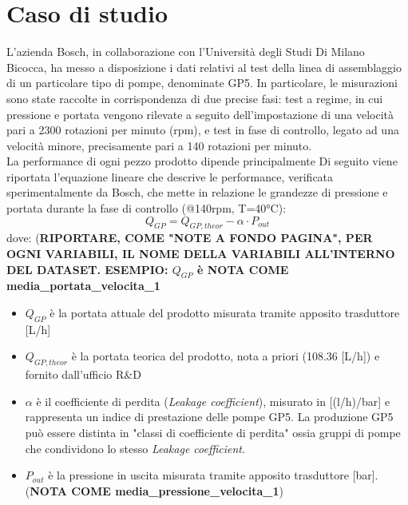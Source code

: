 \documentclass[fleqn,10pt]{SelfArx} %
\affiliation{\textsuperscript{1}\textit{794126, Dipartimento di Informatica, Sistemistica e Comunicazione}} %
\affiliation{\textsuperscript{2}\textit{793516, Dipartimento di Informatica, Sistemistica e Comunicazione}} %
\affiliation{\textsuperscript{3}\textit{?, Dipartimento di Informatica, Sistemistica e Comunicazione}}
\begin{document}
\flushbottom %

\maketitle %

\tableofcontents %

\thispagestyle{empty} %


\section{Caso di studio} %
L'azienda Bosch, in collaborazione con l'Università degli Studi Di Milano Bicocca, ha messo a disposizione i dati relativi al test della linea di assemblaggio di un particolare tipo di pompe, denominate GP5. In particolare, le misurazioni sono state raccolte in corrispondenza di due precise fasi: test a regime, in cui pressione e portata vengono rilevate a seguito dell'impostazione di una velocità pari a 2300 rotazioni per minuto (rpm), e test in fase di controllo, legato ad una velocità minore, precisamente pari a 140 rotazioni per minuto.\\
La performance di ogni pezzo prodotto dipende principalmente Di seguito viene riportata l’equazione lineare che descrive le performance, verificata sperimentalmente da
Bosch, che mette in relazione le grandezze di pressione e portata durante la fase di controllo (@140rpm, T=40°C):
\begin{equation}
    Q_{GP} = Q_{GP,theor} − \alpha \cdot P_{out}
\end{equation}
dove: (\textbf{RIPORTARE, COME "NOTE A FONDO PAGINA", PER OGNI VARIABILI, IL NOME DELLA VARIABILI ALL'INTERNO DEL DATASET. ESEMPIO: $Q_{GP}$ è NOTA COME media\_portata\_velocita\_1}
\begin{itemize}
    \item $Q_{GP}$ è la portata attuale del prodotto misurata tramite apposito trasduttore [L/h]
    \item $Q_{GP,theor}$ è la portata teorica del prodotto, nota a priori (108.36 [L/h]) e fornito dall’ufficio R\&D
    \item $\alpha$ è il coefficiente di perdita (\textit{Leakage coefficient}), misurato in [(l/h)/bar] e rappresenta un indice di prestazione delle pompe GP5. La produzione GP5 può essere distinta in "classi di coefficiente di perdita" ossia gruppi di pompe che condividono lo stesso \textit{Leakage coefficient}.
    \item $P_{out}$ è la pressione in uscita misurata tramite apposito trasduttore [bar]. (\textbf{NOTA COME media\_pressione\_velocita\_1})
\end{itemize}
\end{document}
